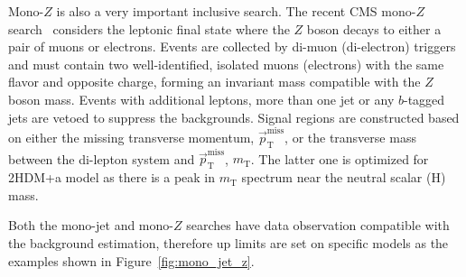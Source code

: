 \documentclass{moriond}
\def\mt{m_{\textrm{T}}}
\def\ptmiss{\vec{p}_\textrm{T}^{\textrm{miss}}}
\begin{document}
Mono-$Z$ is also a very important inclusive search. The recent CMS mono-$Z$
search~\cite{monoz} considers the leptonic final state where the $Z$ boson
decays to either a pair of muons or electrons. Events are collected by di-muon
(di-electron) triggers and must contain two well-identified, isolated muons
(electrons) with the same flavor and opposite charge, forming an invariant mass
compatible with the $Z$ boson mass. Events with additional leptons, more than
one jet or any $b$-tagged jets are vetoed to suppress the backgrounds. Signal
regions are constructed based on either the missing transverse momentum,
$\ptmiss$, or the transverse mass between the di-lepton system and $\ptmiss$,
$\mt$. The latter one is optimized for 2HDM+a model as there is a peak in $\mt$
spectrum near the neutral scalar (H) mass.

Both the mono-jet and mono-$Z$ searches have data observation compatible with the background estimation, therefore up limits are set on specific models as the examples shown in Figure~\ref{fig:mono_jet_z}. 
\end{document}
